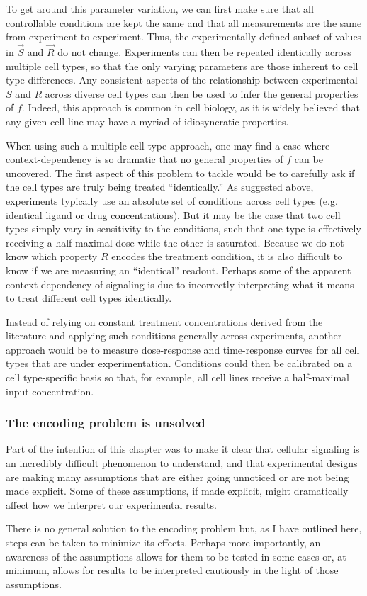 To get around this parameter variation, we can first make sure that
all controllable conditions are kept the same and that all measurements
are the same from experiment to experiment. Thus, the experimentally-defined
subset of values in $\vec{S}$ and $\vec{R}$ do not change. Experiments can
then be repeated identically across multiple cell types, so that the only
varying parameters are those inherent to cell type differences.
Any consistent aspects of the relationship between experimental
$S$ and $R$ across diverse cell types can then be used to infer the
general properties of $f$. Indeed, this approach is common in cell biology,
as it is widely believed that any given cell line may have a myriad of
idiosyncratic properties.


When using such a multiple cell-type approach, one may find a case
where context-dependency is so dramatic that no
general properties of $f$ can be uncovered. The first aspect
of this problem to tackle would be to carefully ask if the cell types
are truly being treated ``identically.'' As suggested above,
experiments typically use an absolute set of conditions across cell types
(e.g. identical ligand or drug concentrations). But it may be the case that two cell
types simply vary in sensitivity to the conditions, such that one type
is effectively receiving a half-maximal dose while the other is saturated.
Because we do not know which property $R$ encodes the treatment condition,
it is also difficult to know if we are measuring an ``identical'' readout.
Perhaps some of the apparent context-dependency of signaling is due to
incorrectly interpreting what it means to treat different cell types
identically.


Instead of relying on constant treatment concentrations
derived from the literature and applying such conditions generally
across experiments, another approach would be to measure dose-response and time-response
curves for all cell types that are under experimentation. Conditions could then be
calibrated on a cell type-specific basis so that, for example, all cell
lines receive a half-maximal input concentration.


\subsubsection{The encoding problem is unsolved}

Part of the intention of this chapter was to make it clear that
cellular signaling is an incredibly difficult phenomenon to understand,
and that experimental designs are making many
assumptions that are either going unnoticed or are not
being made explicit. Some of these assumptions, if made explicit, might
dramatically affect how we interpret our experimental results.


There is no general solution to the encoding problem but,
as I have outlined here, steps can be taken to minimize its effects. Perhaps more
importantly, an awareness of the assumptions allows for them to be tested
in some cases or, at minimum, allows for results to be interpreted cautiously
in the light of those assumptions.

